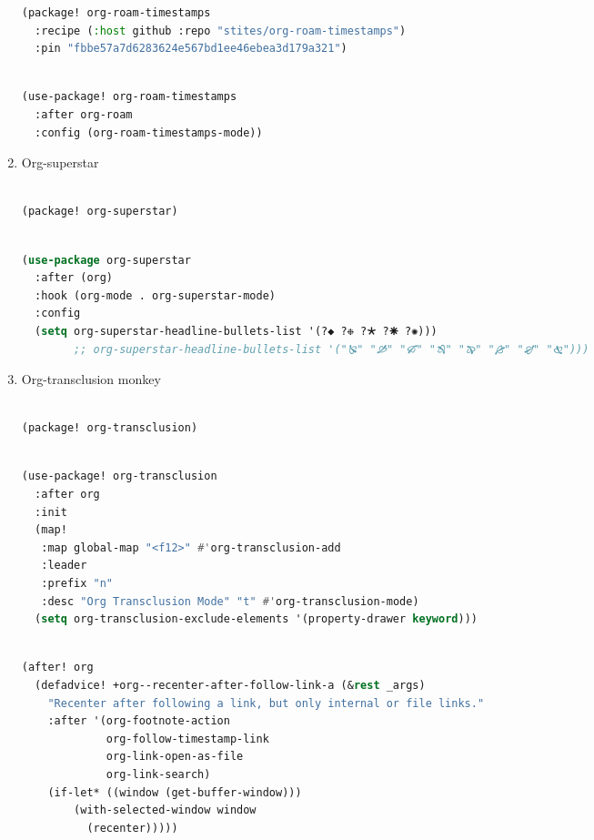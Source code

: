 \documentclass[11pt]{article}
\begin{document}
\begin{enumerate}
\begin{lstlisting}[language=Lisp]
(package! org-roam-timestamps
  :recipe (:host github :repo "stites/org-roam-timestamps")
  :pin "fbbe57a7d6283624e567bd1ee46ebea3d179a321")
\end{lstlisting}

\begin{lstlisting}[language=Lisp]%! Someone please complete this list for me

(use-package! org-roam-timestamps
  :after org-roam
  :config (org-roam-timestamps-mode))
\end{lstlisting}
  \item Org-superstar
  \label{sec:org-superstar}

  \begin{lstlisting}[language=Lisp]%! Someone please complete this list for me

(package! org-superstar)
\end{lstlisting}

\begin{lstlisting}[language=Lisp]%! Someone please complete this list for me

(use-package org-superstar
  :after (org)
  :hook (org-mode . org-superstar-mode)
  :config
  (setq org-superstar-headline-bullets-list '(?◆ ?❉ ?🞱 ?🞽 ?✺)))
        ;; org-superstar-headline-bullets-list '("🙐" "🙑" "🙒" "🙓" "🙔" "🙕" "🙖" "🙗")))
\end{lstlisting}
  \item Org-transclusion\hfill{} monkey
  \label{sec:org-transclusion}

  \begin{lstlisting}[language=Lisp]%! Someone please complete this list for me

(package! org-transclusion)
\end{lstlisting}

\begin{lstlisting}[language=Lisp]%! Someone please complete this list for me

(use-package! org-transclusion
  :after org
  :init
  (map!
   :map global-map "<f12>" #'org-transclusion-add
   :leader
   :prefix "n"
   :desc "Org Transclusion Mode" "t" #'org-transclusion-mode)
  (setq org-transclusion-exclude-elements '(property-drawer keyword)))
\end{lstlisting}

\begin{lstlisting}[language=Lisp]%! Someone please complete this list for me

(after! org
  (defadvice! +org--recenter-after-follow-link-a (&rest _args)
    "Recenter after following a link, but only internal or file links."
    :after '(org-footnote-action
             org-follow-timestamp-link
             org-link-open-as-file
             org-link-search)
    (if-let* ((window (get-buffer-window)))
        (with-selected-window window
          (recenter)))))
\end{lstlisting}


\end{enumerate}
\end{document}
